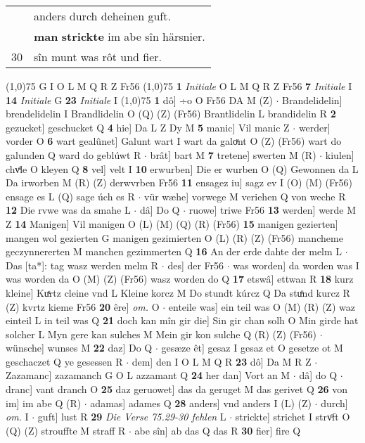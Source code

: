 \documentclass[8pt,a4paper,notitlepage]{article}
\begin{document}
\begin{table}[ht]
\begin{minipage}[t]{0.5\linewidth}
\begin{tabular}{rl}
 & anders durch deheinen guft.\\ 
 & \textbf{man} \textbf{strickte} im abe sîn härsnier.\\ 
30 & sîn munt was rôt und fier.\\ 
\end{tabular}
\scriptsize
\line(1,0){75} \newline
G I O L M Q R Z Fr56 \newline
\line(1,0){75} \newline
\textbf{1} \textit{Initiale} O L M Q R Z Fr56  \textbf{7} \textit{Initiale} I  \textbf{14} \textit{Initiale} G  \textbf{23} \textit{Initiale} I  \newline
\line(1,0){75} \newline
\textbf{1} dô] ÷o O Fr56 DA M (Z)  $\cdot$ Brandelidelin] brendelidelin I Brandlidelin O (Q) (Z) (Fr56) Brantlidelin L brandidelin R \textbf{2} gezucket] geschucket Q \textbf{4} hie] Da L Z Dy M \textbf{5} manic] Vil manic Z  $\cdot$ werder] vorder O \textbf{6} wart gealûnet] Galunt wart I wart da galoͮnt O (Z) (Fr56) wart do galunden Q ward do geblúwt R  $\cdot$ brât] bart M \textbf{7} tretene] swerten M (R)  $\cdot$ kiulen] chvͦle O kleyen Q \textbf{8} vel] velt I \textbf{10} erwurben] Die er wurben O (Q) Gewonnen da L Da irworben M (R) (Z) derwvrben Fr56 \textbf{11} ensagez iu] sagz ev I (O) (M) (Fr56) ensage es L (Q) sage úch es R  $\cdot$ vür wæhe] vorwege M veriehen Q von weche R \textbf{12} Die rvwe was da smahe L  $\cdot$ dâ] Do Q  $\cdot$ ruowe] triwe Fr56 \textbf{13} werden] werde M Z \textbf{14} Manigen] Vil manigen O (L) (M) (Q) (R) (Fr56) \textbf{15} manigen gezierten] mangen wol gezierten G manigen gezimierten O (L) (R) (Z) (Fr56) mancheme geczynnererten M manchen gezimmerten Q \textbf{16} An der erde dahte der melm L  $\cdot$ Das [ta*]: tag wasz werden melm R  $\cdot$ des] der Fr56  $\cdot$ was worden] da worden was I was worden da O (M) (Z) (Fr56) wasz worden do Q \textbf{17} etswâ] ettwan R \textbf{18} kurz kleine] Kuͯrtz cleine vnd L Kleine korcz M Do stundt kúrcz Q Da stuͦnd kurcz R (Z) kvrtz kieme Fr56 \textbf{20} êre] \textit{om.} O  $\cdot$ enteile was] ein teil was O (M) (R) (Z) waz einteil L in teil was Q \textbf{21} doch kan mîn gir die] Sin gir chan solh O Min girde hat solcher L Myn gere kan sulches M Mein gir kon sulche Q (R) (Z) (Fr56)  $\cdot$ wünsche] wunses M \textbf{22} daz] Do Q  $\cdot$ gesæze êt] gesaz I gesaz et O gesetze ot M geschaczet Q ye gesessen R  $\cdot$ dem] den I O L M Q R \textbf{23} dô] Da M R Z  $\cdot$ Zazamanc] zazamanch G O L azzamant Q \textbf{24} her dan] Vort an M  $\cdot$ dâ] do Q  $\cdot$ dranc] vant dranch O \textbf{25} daz geruowet] das da geruget M das gerivet Q \textbf{26} von im] im abe Q (R)  $\cdot$ adamas] adames Q \textbf{28} anders] vnd anders I (L) (Z)  $\cdot$ durch] \textit{om.} I  $\cdot$ guft] lust R \textbf{29} \textit{Die Verse 75.29-30 fehlen} L   $\cdot$ strickte] strichet I strvͦft O (Q) (Z) strouffte M straff R  $\cdot$ abe sîn] ab das Q das R \textbf{30} fier] fire Q \newline

\end{minipage}
\end{table}
\end{document}

